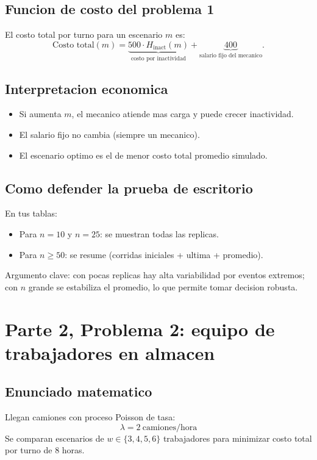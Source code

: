 \documentclass[12pt,a4paper]{article}
\begin{document}
\subsection{Funcion de costo del problema 1}
El costo total por turno para un escenario $m$ es:
\[
\text{Costo total}(m)=\underbrace{500\cdot H_{\text{inact}}(m)}_{\text{costo por inactividad}}+\underbrace{400}_{\text{salario fijo del mecanico}}.
\]

\subsection{Interpretacion economica}
\begin{itemize}
  \item Si aumenta $m$, el mecanico atiende mas carga y puede crecer inactividad.
  \item El salario fijo no cambia (siempre un mecanico).
  \item El escenario optimo es el de menor costo total promedio simulado.
\end{itemize}

\subsection{Como defender la prueba de escritorio}
En tus tablas:
\begin{itemize}
  \item Para $n=10$ y $n=25$: se muestran todas las replicas.
  \item Para $n\ge 50$: se resume (corridas iniciales + ultima + promedio).
\end{itemize}
Argumento clave: con pocas replicas hay alta variabilidad por eventos extremos; con $n$ grande se estabiliza el promedio, lo que permite tomar decision robusta.

\section{Parte 2, Problema 2: equipo de trabajadores en almacen}

\subsection{Enunciado matematico}
Llegan camiones con proceso Poisson de tasa:
\[
\lambda=2\ \text{camiones/hora}
\]
Se comparan escenarios de $w\in\{3,4,5,6\}$ trabajadores para minimizar costo total por turno de 8 horas.
\end{document}
